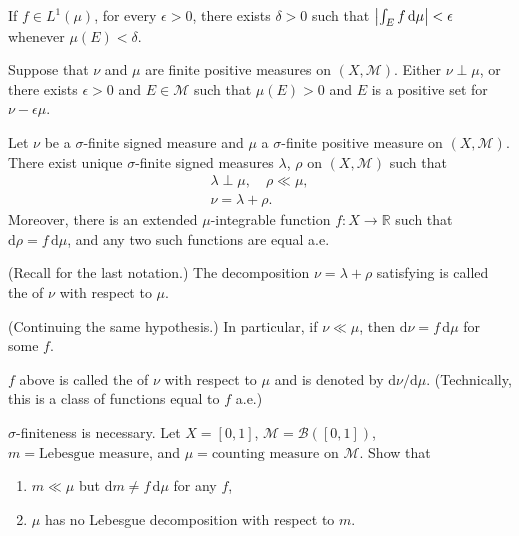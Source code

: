 \documentclass[12pt]{article}	%
\begin{document}
\begin{cor}
	If $f \in L^{1}(\mu)$, for every $\epsilon > 0$, there exists $\delta > 0$ such that ${\left\lvert \int_{E}^{} f \,{\mathrm{d}}\mu \right\lvert} < \epsilon$ whenever $\mu(E) < \delta$.
\end{cor}

\begin{prop}
	Suppose that $\nu$ and $\mu$ are finite positive measures on $(X, \mathcal{M})$. Either $\nu \perp \mu$, or there exists $\epsilon > 0$ and $E \in \mathcal{M}$ such that $\mu(E) > 0$ and $E$ is a positive set for $\nu - \epsilon \mu$.
\end{prop}

\begin{thm}
	Let $\nu$ be a $\sigma$-finite signed measure and $\mu$ a $\sigma$-finite positive measure on $(X, \mathcal{M})$. There exist unique $\sigma$-finite signed measures $\lambda$, $\rho$ on $(X, \mathcal{M})$ such that
	\begin{align}
		\lambda \perp \mu, \quad \rho \ll \mu, \label{eq:003} \\
		\nu = \lambda + \rho. \label{eq:004}
	\end{align}
	Moreover, there is an extended $\mu$-integrable function $f : X \to \mathbb{R}$ such that ${\mathrm d}\rho = f \,{\mathrm d}\mu$, and any two such functions are equal a.e.
\end{thm}
(Recall  for the last notation.) The decomposition $\nu = \lambda + \rho$ satisfying  is called the  of $\nu$ with respect to $\mu$.
\begin{cor}
	(Continuing the same hypothesis.) In particular, if $\nu \ll \mu$, then ${\mathrm d} \nu = f \,{\mathrm d} \mu$ for some $f$.
\end{cor}
$f$ above is called the  of $\nu$ with respect to $\mu$ and is denoted by ${\mathrm d} \nu/{\mathrm d} \mu$. (Technically, this is a class of functions equal to $f$ a.e.)

\begin{exe}
	$\sigma$-finiteness is necessary. Let $X = [0, 1]$, $\mathcal{M} = \mathcal{B}([0, 1])$, $m = \text{Lebesgue measure}$, and $\mu = \text{counting measure}$ on $\mathcal{M}$. Show that
	\begin{enumerate}
		\item $m \ll \mu$ but ${\mathrm d} m \neq f \,{\mathrm d} \mu$ for any $f$,
		\item $\mu$ has no Lebesgue decomposition with respect to $m$.
	\end{enumerate}
\end{exe}
\end{document}
